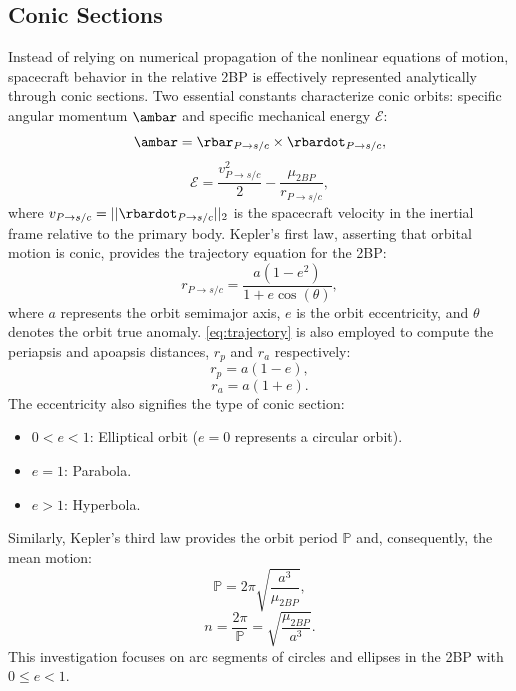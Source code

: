 \subsection{Conic Sections}
Instead of relying on numerical propagation of the nonlinear equations of motion, spacecraft
behavior in the relative 2BP is effectively represented analytically through conic sections. Two
essential constants characterize conic orbits: specific angular momentum $\ambar$ and specific
mechanical energy $\mathcal{E}$:
\begin{equation}
    \ambar=\rbar_{P\rightarrow s/c}\times\rbardot_{P\rightarrow s/c},
    \label{eq:angularmomentum}
\end{equation}
\vspace{1mm}
\begin{equation}
    \mathcal{E}=\frac{v_{P\rightarrow s/c}^{2}}{2}-\frac{\mu_{2BP}}{r_{P\rightarrow s/c}},
    \label{eq:energy}
\end{equation}
where $v_{P\rightarrow s/c}=||\rbardot_{P\rightarrow s/c}||_{2}$ is the spacecraft velocity in the
inertial frame relative to the primary body. Kepler's first law, asserting that orbital motion is
conic, provides the trajectory equation for the 2BP:
\begin{equation}
    r_{P\rightarrow s/c}=\frac{a(1-e^{2})}{1+e\cos(\theta)},
    \label{eq:trajectory}
\end{equation}
where $a$ represents the orbit semimajor axis, $e$ is the orbit eccentricity, and $\theta$ denotes
the orbit true anomaly. \cref{eq:trajectory} is also employed to compute the periapsis and apoapsis
distances, $r_{p}$ and $r_{a}$ respectively:
\begin{equation}
    r_{p}=a(1-e),
    \label{eq:periapsis}
\end{equation}
\begin{equation}
    r_{a}=a(1+e).
    \label{eq:apoapsis}
\end{equation}
The eccentricity also signifies the type of conic section:
\begin{itemize}
    \item   $0<e<1$: Elliptical orbit ($e=0$ represents a circular orbit).
    \item   $e=1$: Parabola.
    \item   $e>1$: Hyperbola.
\end{itemize}
Similarly, Kepler's third law provides the orbit period $\mathbb{P}$ and, consequently, the mean
motion:
\begin{equation}
    \mathbb{P}=2\pi\sqrt{\frac{a^{3}}{\mu_{2BP}}},
    \label{eq:period}
\end{equation}
\vspace{1mm}
\begin{equation}
    n=\frac{2\pi}{\mathbb{P}}=\sqrt{\frac{\mu_{2BP}}{a^{3}}}.
    \label{eq:meanmotion}
\end{equation}
This investigation focuses on arc segments of circles and ellipses in the 2BP with $0\leq e<1$.

